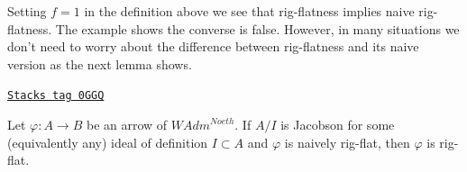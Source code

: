 Setting $f = 1$ in the definition above we see that rig-flatness
implies naive rig-flatness. The example shows the converse is false.
However, in many situations we don't need to worry about the difference
between rig-flatness and its naive version as the next lemma shows.

\begin{lemma}
\label{restricted-lemma-rig-flat-naive}
\href{https://stacks.math.columbia.edu/tag/0GGQ}{\texttt{Stacks tag 0GGQ}}

Let $\varphi : A \to B$ be an arrow of $\textit{WAdm}^{Noeth}$.
If $A/I$ is Jacobson for some (equivalently any) ideal of definition
$I \subset A$ and $\varphi$ is naively rig-flat, then $\varphi$ is
rig-flat.
\end{lemma}

